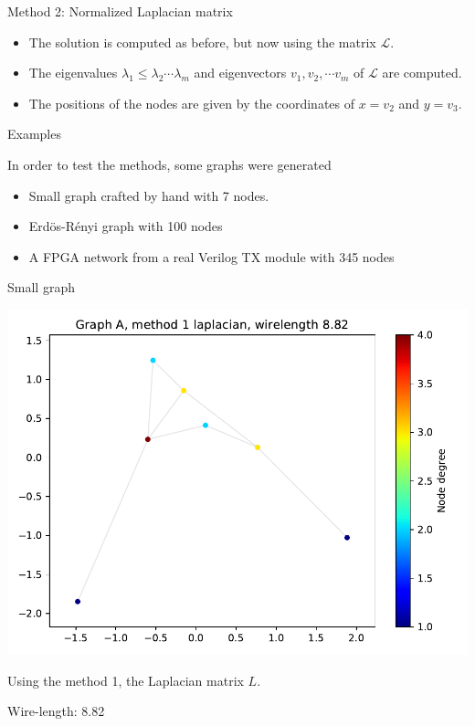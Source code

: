 \documentclass[serif, 12pt]{beamer}
\begin{document}
\begin{frame}{Method 2: Normalized Laplacian matrix}

\begin{itemize}
\item The solution is computed as before, but now using the matrix 
$\mathcal{L}$.

\item The eigenvalues $\lambda_1 \le \lambda_2 \cdots \lambda_m$ and 
eigenvectors $v_1, v_2, \cdots v_m$ of $\mathcal L$ are computed.

\item The positions of the nodes are given by the coordinates of $x = v_2$ and 
$y = v_3$.
\end{itemize}


\end{frame}

\begin{frame}{Examples}

In order to test the methods, some graphs were generated

\begin{itemize}
\item Small graph crafted by hand with 7 nodes.
\item Erdös-Rényi graph with 100 nodes
\item A FPGA network from a real Verilog TX module with 345 nodes
\end{itemize}

\end{frame}

\begin{frame}{Small graph}
\begin{center}
\includegraphics[scale=0.5]{A/laplacian.pdf}
\end{center}
Using the method 1, the Laplacian matrix $L$.

Wire-length: 8.82
\end{frame}
\end{document}

